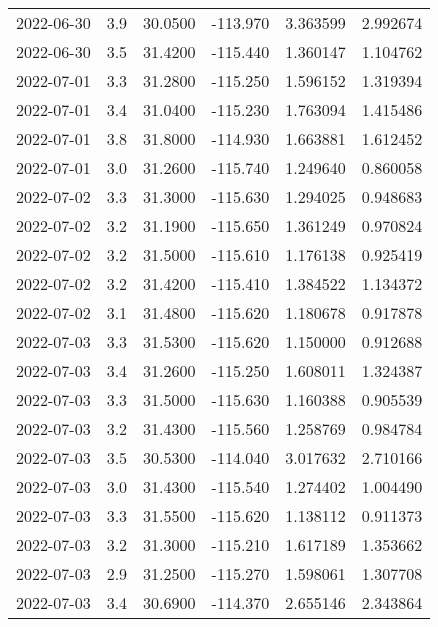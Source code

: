 \begin{tabular}{lrrrrr}
2022-06-30 &       3.9 &  30.0500 &  -113.970 &         3.363599 &         2.992674 \\
2022-06-30 &       3.5 &  31.4200 &  -115.440 &         1.360147 &         1.104762 \\
2022-07-01 &       3.3 &  31.2800 &  -115.250 &         1.596152 &         1.319394 \\
2022-07-01 &       3.4 &  31.0400 &  -115.230 &         1.763094 &         1.415486 \\
2022-07-01 &       3.8 &  31.8000 &  -114.930 &         1.663881 &         1.612452 \\
2022-07-01 &       3.0 &  31.2600 &  -115.740 &         1.249640 &         0.860058 \\
2022-07-02 &       3.3 &  31.3000 &  -115.630 &         1.294025 &         0.948683 \\
2022-07-02 &       3.2 &  31.1900 &  -115.650 &         1.361249 &         0.970824 \\
2022-07-02 &       3.2 &  31.5000 &  -115.610 &         1.176138 &         0.925419 \\
2022-07-02 &       3.2 &  31.4200 &  -115.410 &         1.384522 &         1.134372 \\
2022-07-02 &       3.1 &  31.4800 &  -115.620 &         1.180678 &         0.917878 \\
2022-07-03 &       3.3 &  31.5300 &  -115.620 &         1.150000 &         0.912688 \\
2022-07-03 &       3.4 &  31.2600 &  -115.250 &         1.608011 &         1.324387 \\
2022-07-03 &       3.3 &  31.5000 &  -115.630 &         1.160388 &         0.905539 \\
2022-07-03 &       3.2 &  31.4300 &  -115.560 &         1.258769 &         0.984784 \\
2022-07-03 &       3.5 &  30.5300 &  -114.040 &         3.017632 &         2.710166 \\
2022-07-03 &       3.0 &  31.4300 &  -115.540 &         1.274402 &         1.004490 \\
2022-07-03 &       3.3 &  31.5500 &  -115.620 &         1.138112 &         0.911373 \\
2022-07-03 &       3.2 &  31.3000 &  -115.210 &         1.617189 &         1.353662 \\
2022-07-03 &       2.9 &  31.2500 &  -115.270 &         1.598061 &         1.307708 \\
2022-07-03 &       3.4 &  30.6900 &  -114.370 &         2.655146 &         2.343864 \\

\end{tabular}
